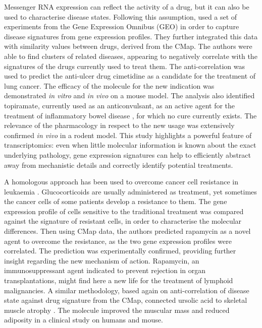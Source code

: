 Messenger RNA expression can reflect the activity of a drug, but it can also be used to characterise disease states. Following this assumption, \cite{sirota2011discovery} used a set of experiments from the Gene Expression Omnibus (GEO) in order to capture disease signatures from gene expression profiles. They further integrated this data with similarity values between drugs, derived from the CMap. The authors were able to find clusters of related diseases, appearing to negatively correlate with the signatures of the drugs currently used to treat them. The anti-correlation was used to predict the anti-ulcer drug cimetidine as a candidate for the treatment of lung cancer. The efficacy of the molecule for the new indication was demonstrated \emph{in vitro} and \emph{in vivo} on a mouse model. The analysis also identified topiramate, currently used as an anticonvulsant, as an active agent for the treatment of inflammatory bowel disease \citep{dudley2011computational}, for which no cure currently exists. The relevance of the pharmacology in respect to the new usage was extensively confirmed \emph{in vivo} in a rodent model. This study highlights a powerful feature of transcriptomics: even when little molecular information is known about the exact underlying pathology, gene expression signatures can help to efficiently abstract away from mechanistic details and correctly identify potential treatments.

A homologous approach has been used to overcome cancer cell resistance in leukaemia \citep{wei2006gene}. Glucocorticoids are usually administered as treatment, yet sometimes the cancer cells of some patients develop a resistance to them. The gene expression profile of cells sensitive to the traditional treatment was compared against the signature of resistant cells, in order to characterise the molecular differences. Then using CMap data, the authors predicted rapamycin as a novel agent to overcome the resistance, as the two gene expression profiles were correlated. The prediction was experimentally confirmed, providing further insight regarding the new mechanism of action. Rapamycin, an immunosuppressant agent indicated to prevent rejection in organ transplantations, might find here a new life for the treatment of lymphoid malignancies. A similar methodology, based again on anti-correlation of disease state against drug signature from the CMap, connected ursolic acid to skeletal muscle atrophy \citep{kunkel2011mrna}. The molecule improved the muscular mass and reduced adiposity in a clinical study on humans and mouse.

